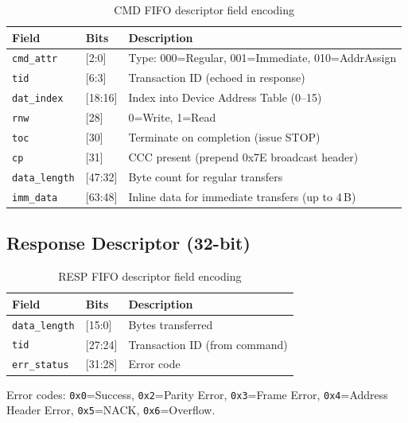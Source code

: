 \documentclass[12pt, a4paper, oneside]{report}
\begin{document}
\begin{table}[H]
\centering
\caption{CMD FIFO descriptor field encoding}
\label{tab:cmd_desc}
\begin{tabular}{L{3cm} L{2.5cm} L{7cm}}
\toprule
\textbf{Field} & \textbf{Bits} & \textbf{Description} \\
\midrule
\texttt{cmd\_attr} & {[2:0]}  & Type: 000=Regular, 001=Immediate, 010=AddrAssign \\
\texttt{tid}       & {[6:3]}  & Transaction ID (echoed in response) \\
\texttt{dat\_index}& {[18:16]}& Index into Device Address Table (0--15) \\
\texttt{rnw}       & {[28]}   & 0=Write, 1=Read \\
\texttt{toc}       & {[30]}   & Terminate on completion (issue STOP) \\
\texttt{cp}        & {[31]}   & CCC present (prepend 0x7E broadcast header) \\
\texttt{data\_length}& {[47:32]}& Byte count for regular transfers \\
\texttt{imm\_data} & {[63:48]}& Inline data for immediate transfers (up to 4\,B) \\
\bottomrule
\end{tabular}
\end{table}

\subsection{Response Descriptor (32-bit)}

\begin{table}[H]
\centering
\caption{RESP FIFO descriptor field encoding}
\label{tab:resp_desc}
\begin{tabular}{L{3.5cm} L{2.5cm} L{6.5cm}}
\toprule
\textbf{Field} & \textbf{Bits} & \textbf{Description} \\
\midrule
\texttt{data\_length} & {[15:0]}  & Bytes transferred \\
\texttt{tid}          & {[27:24]} & Transaction ID (from command) \\
\texttt{err\_status}  & {[31:28]} & Error code \\
\bottomrule
\end{tabular}
\end{table}

Error codes: \texttt{0x0}=Success, \texttt{0x2}=Parity Error, \texttt{0x3}=Frame
Error, \texttt{0x4}=Address Header Error, \texttt{0x5}=NACK, \texttt{0x6}=Overflow.
\end{document}
